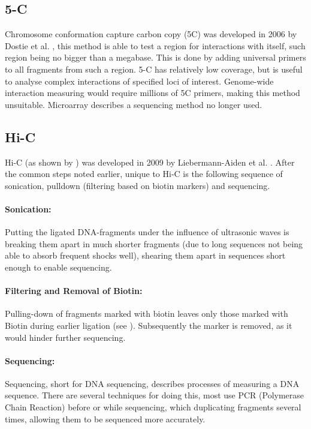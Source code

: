 \subsection{5-C}\label{sec:5C}

Chromosome conformation capture carbon copy (5C) was developed in 2006 by
Dostie et al. \cite{dostie2006chromosome}, this method is able to test a region
for interactions with itself, such region being no bigger than a megabase. This
is done by adding universal primers to all fragments from such a region.
5-C has relatively low coverage, but is useful to analyse complex interactions
of specified loci of interest. Genome-wide interaction measuring would require
millions of 5C primers, making this method unsuitable. Microarray describes a
sequencing method no longer used.







\subsection{Hi-C}\label{sec:HiC}

Hi-C (as shown by ) was developed in 2009 by Liebermann-Aiden et al.
\cite{lieberman2009comprehensive}. After the common steps noted earlier, unique
to Hi-C is the following sequence of sonication, pulldown (filtering based on
biotin markers) and sequencing.


\paragraph{Sonication:}\label{sec:sonication}
Putting the ligated DNA-fragments under the influence of ultrasonic waves is
breaking them apart in much shorter fragments (due to long sequences not being
able to absorb frequent shocks well), shearing them apart in sequences short
enough to enable sequencing.


\paragraph{Filtering and Removal of Biotin:}\label{sec:pulldown}
Pulling-down of fragments marked with biotin leaves only those marked with
Biotin during earlier ligation (see ). Subsequently the
marker is removed, as it would hinder further sequencing.


\paragraph{Sequencing:}\label{sec:sequencing}
Sequencing, short for DNA sequencing, describes processes of measuring a DNA
sequence. There are several techniques for doing this, most use PCR (Polymerase
Chain Reaction) before or while sequencing, which duplicating fragments
several times, allowing them to be sequenced more accurately.

